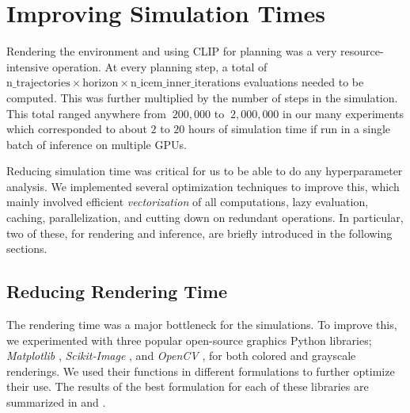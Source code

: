 

\chapter{Improving Simulation Times}
\label{sec:efficiency}
Rendering the environment and using CLIP for planning was a very resource-intensive operation.
At every planning step, a total of \(\text{n\_trajectories} \times \text{horizon} \times \text{n\_icem\_inner\_iterations}\) evaluations needed to be computed.
This was further multiplied by the number of steps in the simulation.
This total ranged anywhere from \(~200,000\) to \(~2,000,000\) in our many experiments which corresponded to about \(2\) to \(20\) hours of simulation time if run in a single batch of inference on multiple GPUs.

Reducing simulation time was critical for us to be able to do any hyperparameter analysis.
We implemented several optimization techniques to improve this, which mainly involved efficient \emph{vectorization} of all computations, lazy evaluation, caching, parallelization, and cutting down on redundant operations.
In particular, two of these, for rendering and inference, are briefly introduced in the following sections.

\section{Reducing Rendering Time}
\label{sec:improving-render}
The rendering time was a major bottleneck for the simulations.
To improve this, we experimented with three popular open-source graphics Python libraries; \emph{Matplotlib} \citep{matplotlib}, \emph{Scikit-Image} \citep{skimage}, and \emph{OpenCV} \citep{opencv}, for both colored and grayscale renderings.
We used their functions in different formulations to further optimize their use.
The results of the best formulation for each of these libraries are summarized in  and .\\

